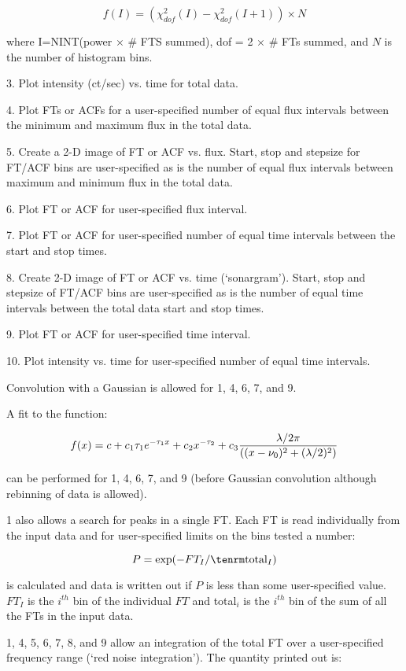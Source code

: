 $$f(I) = (\chi^{2}_{dof}(I)-\chi^{2}_{dof}(I+1))\times N$$

\item{}where I=NINT(power $\times$ \# FTS summed), dof = 2 $\times$ \# FTs
summed, and $N$ is the number of histogram bins.
\item{3.} Plot intensity (ct/sec) vs. time for total data.
\item{4.} Plot FTs or ACFs for a user-specified number of equal flux
intervals between the minimum and maximum flux in the total data.
\item{5.} Create a 2-D image of FT or ACF vs. flux. Start, stop and
stepsize for FT/ACF bins are user-specified as is the number of equal
flux intervals between maximum and minimum flux in the total data.
\item{6.} Plot FT or ACF for user-specified flux interval.
\item{7.} Plot FT or ACF for user-specified number of equal time
intervals between the start and stop times.
\item{8.} Create 2-D image of FT or ACF vs. time (`sonargram').
Start, stop and stepsize of FT/ACF bins are user-specified as is the
number of equal time intervals between the total data start and stop
times.
\item{9.} Plot FT or ACF for user-specified time interval.
\item{10.} Plot intensity vs. time for user-specified number of equal
time intervals.


Convolution with a Gaussian is allowed for 1, 4, 6, 7, and 9.

A fit to the function:

$$f(x) =
c+c_{1}\tau_{1}e^{-\tau_{1}x}+c_{2}x^{-\tau_{2}}+c_{3}{\lambda/2\pi\over
((x-\nu_{0})^{2}+(\lambda/2)^{2})}$$

can be performed for 1, 4, 6, 7, and 9 (before Gaussian convolution
although rebinning of data is allowed).

1 also allows a search for peaks in a single FT.  Each FT is read
individually from the input data and for user-specified limits on the
bins tested a number:

$$P = \exp(-FT_{I}/{\rm total}_{I})$$

is calculated and data is written out if $P$ is less than some
user-specified value. $FT_I$ is the $i^{th}$ bin of the individual $FT$
and total$_i$ is the $i^{th}$ bin of the sum of all the FTs in the
input data.

1, 4, 5, 6, 7, 8, and 9 allow an integration of the total FT over a
user-specified frequency range (`red noise integration').  The
quantity printed out is:

